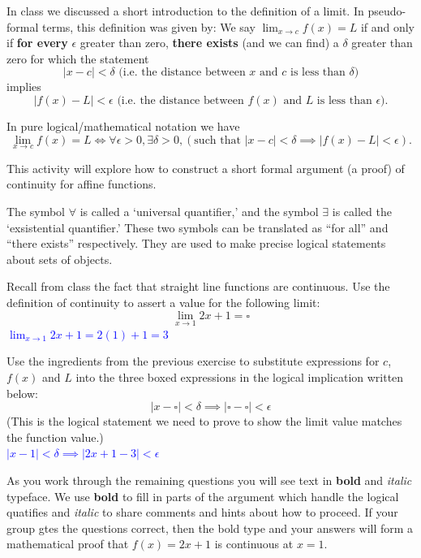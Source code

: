 \documentclass{ximera}
\begin{document}
\begin{definition}
    In class we discussed a short introduction to the definition of a limit.  In pseudo-formal terms, this definition was given by:
    We say $\lim_{x\rightarrow c}f(x)=L$ if and only if \textbf{for every} $\epsilon$ greater than zero, \textbf{there exists} (and we can find) a $\delta$ greater than zero for which the statement
        \[|x-c|<\delta \text{  (i.e. the distance between $x$ and $c$ is less than $\delta$)}\] 
    implies
        \[|f(x)-L|<\epsilon \text{  (i.e. the distance between $f(x)$ and $L$ is less than $\epsilon$)}.\] 

    In pure logical/mathematical notation we have 
    \[\lim_{x\rightarrow c}f(x)=L \iff \forall \epsilon>0, \exists \delta>0, (\text{such that } |x-c|<\delta \implies |f(x)-L|<\epsilon).\]
\end{definition}

This activity will explore how to construct a short formal argument (a proof) of continuity for affine functions.

\begin{remark}
    The symbol $\forall$ is called a `universal quantifier,' and the symbol $\exists$ is called the `exsistential quantifier.'  These two symbols can be translated as ``for all'' and ``there exists'' respectively.  They are used to make precise logical statements about sets of objects.
\end{remark}

\begin{exercise}
    Recall from class the fact that straight line functions are continuous.  Use the definition of continuity to assert a value for the following limit:
    \[\lim_{x\rightarrow 1}2x+1=\square\]
    \textcolor{blue}{$\lim_{x\rightarrow 1}2x+1=2(1)+1=3$}
\end{exercise}

\begin{exercise}
    Use the ingredients from the previous exercise to substitute expressions for $c$, $f(x)$ and $L$ into the three boxed expressions in the logical implication written below:
    \[|x-\square|<\delta \implies |\square-\square|<\epsilon \]
    (This is the logical statement we need to prove to show the limit value matches the function value.)\\
    \textcolor{blue}{$|x-1|<\delta \implies |2x+1-3|<\epsilon $}
\end{exercise}


As you work through the remaining questions you will see text in \textbf{bold} and \textit{italic} typeface.  We use \textbf{bold} to fill in parts of the argument which handle the logical quatifies and \textit{italic} to share comments and hints about how to proceed.  If your group gtes the questions correct, then the bold type and your answers will form a mathematical proof that $f(x)=2x+1$ is continuous at $x=1$.
\end{document}
